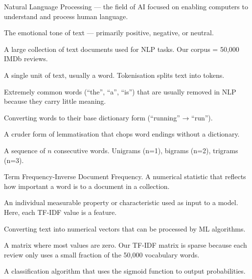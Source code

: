 \documentclass[12pt, a4paper]{article}
\begin{document}
\begin{description}[style=nextline, leftmargin=2cm, labelwidth=1.8cm, font=\bfseries\color{primary}]

\item[NLP] Natural Language Processing — the field of AI focused on enabling computers to understand and process human language.

\item[Sentiment] The emotional tone of text — primarily positive, negative, or neutral.

\item[Corpus] A large collection of text documents used for NLP tasks. Our corpus = 50{,}000 IMDb reviews.

\item[Token] A single unit of text, usually a word. Tokenisation splits text into tokens.

\item[Stopwords] Extremely common words (``the'', ``a'', ``is'') that are usually removed in NLP because they carry little meaning.

\item[Lemmatisation] Converting words to their base dictionary form (``running'' → ``run'').

\item[Stemming] A cruder form of lemmatisation that chops word endings without a dictionary.

\item[N-gram] A sequence of $n$ consecutive words. Unigrams (n=1), bigrams (n=2), trigrams (n=3).

\item[TF-IDF] Term Frequency-Inverse Document Frequency. A numerical statistic that reflects how important a word is to a document in a collection.

\item[Feature] An individual measurable property or characteristic used as input to a model. Here, each TF-IDF value is a feature.

\item[Vectorisation] Converting text into numerical vectors that can be processed by ML algorithms.

\item[Sparse Matrix] A matrix where most values are zero. Our TF-IDF matrix is sparse because each review only uses a small fraction of the 50{,}000 vocabulary words.

\item[Logistic Regression] A classification algorithm that uses the sigmoid function to output probabilities.


\end{description}
\end{document}
